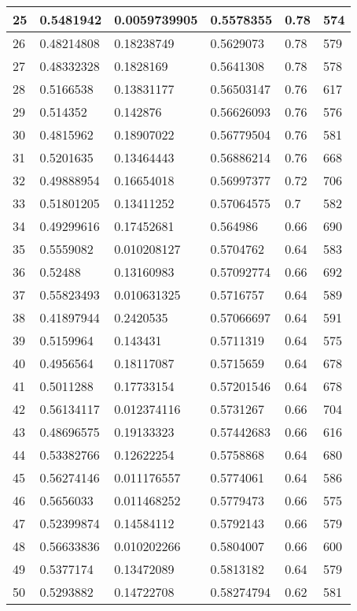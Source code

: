 \begin{longtable}{|l|l|l|l|l|l|}
25 & 0.5481942 & 0.0059739905 & 0.5578355 & 0.78 & 574 \\ \hline 
26 & 0.48214808 & 0.18238749 & 0.5629073 & 0.78 & 579 \\ \hline 
27 & 0.48332328 & 0.1828169 & 0.5641308 & 0.78 & 578 \\ \hline 
28 & 0.5166538 & 0.13831177 & 0.56503147 & 0.76 & 617 \\ \hline 
29 & 0.514352 & 0.142876 & 0.56626093 & 0.76 & 576 \\ \hline 
30 & 0.4815962 & 0.18907022 & 0.56779504 & 0.76 & 581 \\ \hline 
31 & 0.5201635 & 0.13464443 & 0.56886214 & 0.76 & 668 \\ \hline 
32 & 0.49888954 & 0.16654018 & 0.56997377 & 0.72 & 706 \\ \hline 
33 & 0.51801205 & 0.13411252 & 0.57064575 & 0.7 & 582 \\ \hline 
34 & 0.49299616 & 0.17452681 & 0.564986 & 0.66 & 690 \\ \hline 
35 & 0.5559082 & 0.010208127 & 0.5704762 & 0.64 & 583 \\ \hline 
36 & 0.52488 & 0.13160983 & 0.57092774 & 0.66 & 692 \\ \hline 
37 & 0.55823493 & 0.010631325 & 0.5716757 & 0.64 & 589 \\ \hline 
38 & 0.41897944 & 0.2420535 & 0.57066697 & 0.64 & 591 \\ \hline 
39 & 0.5159964 & 0.143431 & 0.5711319 & 0.64 & 575 \\ \hline 
40 & 0.4956564 & 0.18117087 & 0.5715659 & 0.64 & 678 \\ \hline 
41 & 0.5011288 & 0.17733154 & 0.57201546 & 0.64 & 678 \\ \hline 
42 & 0.56134117 & 0.012374116 & 0.5731267 & 0.66 & 704 \\ \hline 
43 & 0.48696575 & 0.19133323 & 0.57442683 & 0.66 & 616 \\ \hline 
44 & 0.53382766 & 0.12622254 & 0.5758868 & 0.64 & 680 \\ \hline 
45 & 0.56274146 & 0.011176557 & 0.5774061 & 0.64 & 586 \\ \hline 
46 & 0.5656033 & 0.011468252 & 0.5779473 & 0.66 & 575 \\ \hline 
47 & 0.52399874 & 0.14584112 & 0.5792143 & 0.66 & 579 \\ \hline 
48 & 0.56633836 & 0.010202266 & 0.5804007 & 0.66 & 600 \\ \hline 
49 & 0.5377174 & 0.13472089 & 0.5813182 & 0.64 & 579 \\ \hline 
50 & 0.5293882 & 0.14722708 & 0.58274794 & 0.62 & 581 \\ \hline 
\end{longtable}